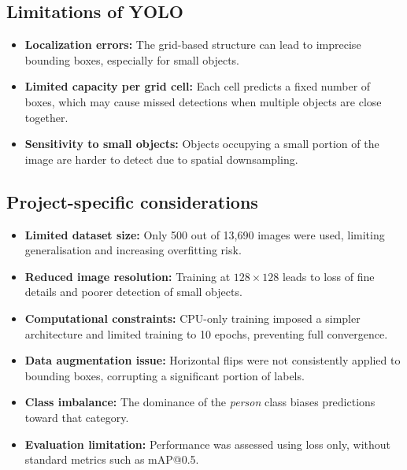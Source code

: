 \documentclass[10pt, a4paper]{article}
\begin{document}
\subsection{Limitations of YOLO}
\begin{itemize}
	\item \textbf{Localization errors:} The grid-based structure can lead to imprecise bounding boxes, especially for small objects.
	
	\item \textbf{Limited capacity per grid cell:} Each cell predicts a fixed number of boxes, which may cause missed detections when multiple objects are close together.
	
	\item \textbf{Sensitivity to small objects:} Objects occupying a small portion of the image are harder to detect due to spatial downsampling.
\end{itemize}

\subsection{Project-specific considerations}

\begin{itemize}
	\item \textbf{Limited dataset size:} Only 500 out of 13,690 images were used, limiting generalisation and increasing overfitting risk.
	
	\item \textbf{Reduced image resolution:} Training at $128\times128$ leads to loss of fine details and poorer detection of small objects.
	
	\item \textbf{Computational constraints:} CPU-only training imposed a simpler architecture and limited training to 10 epochs, preventing full convergence.
	
	\item \textbf{Data augmentation issue:} Horizontal flips were not consistently applied to bounding boxes, corrupting a significant portion of labels.
	
	\item \textbf{Class imbalance:} The dominance of the \textit{person} class biases predictions toward that category.
	
	\item \textbf{Evaluation limitation:} Performance was assessed using loss only, without standard metrics such as mAP@0.5.
\end{itemize}
\end{document}
